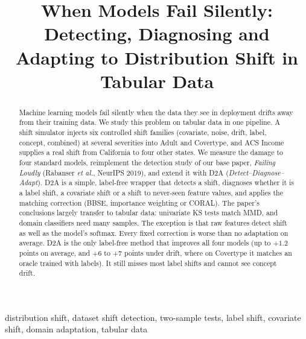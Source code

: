 \documentclass[conference]{IEEEtran}
\newcommand{\Dtwo}{\textsc{D2A}}
\begin{document}
\title{When Models Fail Silently: Detecting, Diagnosing and Adapting to Distribution Shift in Tabular Data}

\author{
}

\maketitle

\begin{abstract}
Machine learning models fail silently when the data they see in deployment drifts away from their training data. We study this problem on tabular data in one pipeline. A shift simulator injects six controlled shift families (covariate, noise, drift, label, concept, combined) at several severities into Adult and Covertype, and ACS Income supplies a real shift from California to four other states. We measure the damage to four standard models, reimplement the detection study of our base paper, \emph{Failing Loudly} (Rabanser \emph{et al.}, NeurIPS 2019), and extend it with \Dtwo{} (\emph{Detect--Diagnose--Adapt}). \Dtwo{} is a simple, label-free wrapper that detects a shift, diagnoses whether it is a label shift, a covariate shift or a shift to never-seen feature values, and applies the matching correction (BBSE, importance weighting or CORAL). The paper's conclusions largely transfer to tabular data: univariate KS tests match MMD, and domain classifiers need many samples. The exception is that raw features detect shift as well as the model's softmax. Every fixed correction is worse than no adaptation on average. \Dtwo{} is the only label-free method that improves all four models (up to $+1.2$ points on average, and $+6$ to $+7$ points under drift, where on Covertype it matches an oracle trained with labels). It still misses most label shifts and cannot see concept drift.
\end{abstract}

\begin{IEEEkeywords}
distribution shift, dataset shift detection, two-sample tests, label shift, covariate shift, domain adaptation, tabular data
\end{IEEEkeywords}
\end{document}
